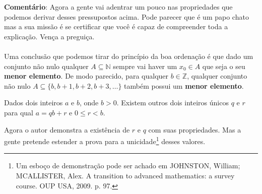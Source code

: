 \documentclass[main.tex]{subfiles}
\begin{document}
\textbf{Comentário}: Agora a gente vai adentrar um pouco nas propriedades que podemos derivar desses pressupostos acima. Pode parecer que é um papo chato mas a sua missão é se certificar que você é capaz de compreender toda a explicação. Vença a preguiça.
\\~\\
Uma conclusão que podemos tirar do princípio da boa ordenação é que dado um conjunto não nulo qualquer $A \subseteq \mathbb{N}$ sempre vai haver um $x_0 \in A$ que seja o seu \textbf{menor elemento}. De modo parecido, para qualquer $b \in \mathbb{Z}$, qualquer conjunto não nulo $A \subseteq \{ b, b+1, b+2, b+3, \dots \}$ também possui um \textbf{menor elemento}.

\begin{fact}
Dados dois inteiros $a$ e $b$, onde $b > 0$. Existem outros dois inteiros únicos $q$ e $r$ para qual $a = qb + r$ e $0 \leq r < b$.
\end{fact}

Agora o autor demonstra a existência de $r$ e $q$ com suas propriedades. Mas a gente pretende estender a prova para a unicidade\footnote{Um esboço de demonstração pode ser achado em JOHNSTON, William; MCALLISTER, Alex. A transition to advanced mathematics: a survey course. OUP USA, 2009. p. 97.} desses valores.
\end{document}
